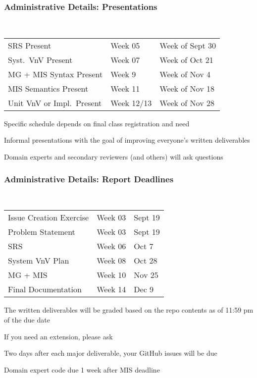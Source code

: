 \documentclass[t,12pt,numbers,fleqn]{beamer}
\begin{document}

\begin{frame}
\frametitle{Administrative Details: Presentations}

~\newline
\begin{tabular}{l l l}
SRS Present & Week 05 & Week of Sept 30\\
Syst.\ VnV Present & Week 07 & Week of Oct 21\\
MG + MIS Syntax Present & Week 9 & Week of Nov 4\\
MIS Semantics Present & Week 11 & Week of Nov 18\\
Unit VnV or Impl.\ Present & Week 12/13 & Week of Nov 28\\
\end {tabular}

\bi
\item Specific schedule depends on final class registration and need
\item Informal presentations with the goal of improving everyone's written
  deliverables
\item Domain experts and secondary reviewers (and others) will ask questions
\ei

\end{frame}


\begin{frame}
\frametitle{Administrative Details: Report Deadlines}
~\newline
\begin{tabular}{l l l}
Issue Creation Exercise & Week 03 & Sept 19\\
Problem Statement & Week 03 & Sept 19\\
SRS & Week 06 & Oct 7\\
System VnV Plan & Week 08 & Oct 28\\
MG + MIS & Week 10 & Nov 25\\
Final Documentation & Week 14 & Dec 9\\
\end {tabular}

\bi
\item The written deliverables will be graded based on the repo contents as of
11:59 pm of the due date
\item If you need an extension, please ask
\item Two days after each major deliverable, your GitHub issues will be due
\item Domain expert code due 1 week after MIS deadline
\ei

\end{frame}
\end{document}
